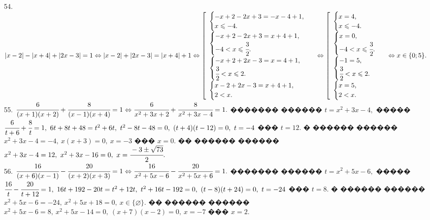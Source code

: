\documentclass[12pt]{article}
\begin{document}
54. $|x-2|-|x+4|+|2x-3|=1\Leftrightarrow|x-2|+|2x-3|=|x+4|+1\Leftrightarrow \left[\begin{array}{l}\begin{cases} -x+2-2x+3=-x-4+1,\\ x\leqslant-4.\end{cases}\\
\begin{cases} -x+2-2x+3=x+4+1,\\ -4<x\leqslant\cfrac{3}{2}.\end{cases}\\ \begin{cases} -x+2+2x-3=x=4+1,\\ \cfrac{3}{2}<x\leqslant2.\end{cases}\\
\begin{cases} x-2+2x-3=x+4+1,\\ 2<x.\end{cases}\end{array}\right.\Leftrightarrow \left[\begin{array}{l}\begin{cases} x=4,\\ x\leqslant-4.\end{cases}\\
\begin{cases} x=0,\\ -4<x\leqslant\cfrac{3}{2}.\end{cases}\\ \begin{cases} -1=5,\\ \cfrac{3}{2}<x\leqslant2.\end{cases}\\
\begin{cases} x=5,\\ 2< x.\end{cases}\end{array}\right.\Leftrightarrow x\in\{0; 5\}.$\\
55. $\cfrac{6}{(x+1)(x+2)}+\cfrac{8}{(x-1)(x+4)}=1\Leftrightarrow \cfrac{6}{x^2+3x+2}+\cfrac{8}{x^2+3x-4}=1.$ ������� ������ $t=x^2+3x-4,$ ����� $\cfrac{6}{t+6}+\cfrac{8}{t}=1,\ 6t+8t+48=t^2+6t,\ t^2-8t-48=0,\ (t+4)(t-12)=0,\ t=-4$ ��� $t=12.$ � ������ ������ $x^2+3x-4=-4,\ x(x+3)=0,\ x=-3$ ��� $x=0.$ �� ������ ������ $x^2+3x-4=12,\ x^2+3x-16=0,\ x=\cfrac{-3\pm\sqrt{73}}{2}.$\\
56. $\cfrac{16}{(x+6)(x-1)}-\cfrac{20}{(x+2)(x+3)}=1\Leftrightarrow\cfrac{16}{x^2+5x-6}-\cfrac{20}{x^2+5x+6}=1.$ ������� ������ $t=x^2+5x-6,$ ����� $\cfrac{16}{t}-\cfrac{20}{t+12}=1,\ 16t+192-20t=t^2+12t,\ t^2+16t-192=0,\ (t-8)(t+24)=0,\ t=-24$ ��� $t=8.$ � ������ ������ $x^2+5x-6=-24,\ x^2+5x+18=0,\ x\in\{\varnothing\}.$ �� ������ ������ $x^2+5x-6=8,\ x^2+5x-14=0,\ (x+7)(x-2)=0,\ x=-7$ ��� $x=2.$\\
\end{document}
